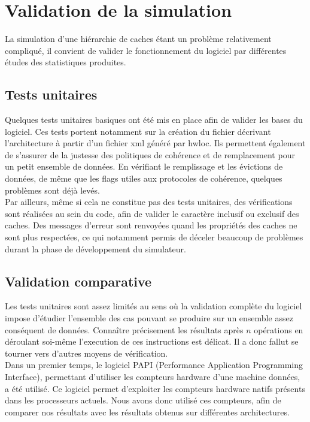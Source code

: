 \section{Validation de la simulation}
La simulation d'une hiérarchie de caches étant un problème relativement compliqué, il convient de valider le fonctionnement du logiciel par différentes études des statistiques produites.

\subsection{Tests unitaires}

Quelques tests unitaires basiques ont été mis en place afin de valider les bases du logiciel. Ces tests portent notamment sur la création du fichier décrivant l'architecture à partir d'un fichier xml généré par hwloc. Ils permettent également de s'assurer de la justesse des politiques de cohérence et de remplacement pour un petit ensemble de données. En vérifiant le remplissage et les évictions de données, de même que les flags utiles aux protocoles de cohérence, quelques problèmes sont déjà levés. \\

Par ailleurs, même si cela ne constitue pas des tests unitaires, des vérifications sont réalisées au sein du code, afin de valider le caractère inclusif ou exclusif des caches. Des messages d'erreur sont renvoyées quand les propriétés des caches ne sont plus respectées, ce qui notamment permis de déceler beaucoup de problèmes durant la phase de développement du simulateur.

\subsection{Validation comparative}

Les tests unitaires sont assez limités au sens où la validation complète du logiciel impose d'étudier l'ensemble des cas pouvant se produire sur un ensemble assez conséquent de données. Connaître précisement les résultats après $n$ opérations en déroulant soi-même l'execution de ces instructions est délicat. Il a donc fallut se tourner vers d'autres moyens de vérification. \\

Dans un premier temps, le logiciel PAPI (Performance Application Programming Interface), permettant d'utiliser les compteurs hardware d'une machine données, a été utilisé. Ce logiciel permet d'exploiter les compteurs hardware natifs présents dans les processeurs actuels. Nous avons donc utilisé ces compteurs, afin de comparer nos résultats avec les résultats obtenus sur différentes architectures. \\

